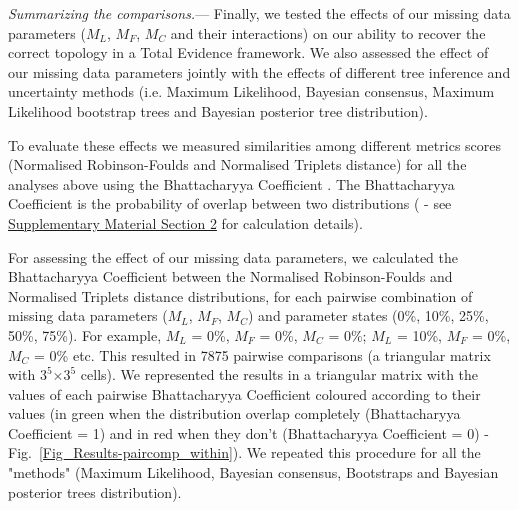 \documentclass[12pt,letterpaper]{article}
\renewcommand{\subsubsection}[1]{%
\vspace{2ex}
\noindent
\textit{#1.}---}
\begin{document}
\subsubsection{Summarizing the comparisons}
Finally, we tested the effects of our missing data parameters ($M_{L}$, $M_{F}$, $M_{C}$ and their interactions) on our ability to recover the correct topology in a Total Evidence framework. We also assessed the effect of our missing data parameters jointly with the effects of different tree inference and uncertainty methods (i.e. Maximum Likelihood, Bayesian consensus, Maximum Likelihood bootstrap trees and Bayesian posterior tree distribution).

To evaluate these effects we measured similarities among different metrics scores (Normalised Robinson-Foulds and Normalised Triplets distance) for all the analyses above using the Bhattacharyya Coefficient \citep{Bhattacharyya}. The Bhattacharyya Coefficient is the probability of overlap between two distributions (\citealt{Bhattacharyya} - see \hyperref[SupplementaryMaterial]{Supplementary Material Section 2} for calculation details).

For assessing the effect of our missing data parameters, we calculated the Bhattacharyya Coefficient between the Normalised Robinson-Foulds and Normalised Triplets distance distributions, for each pairwise combination of missing data parameters ($M_{L}$, $M_{F}$, $M_{C}$) and parameter states (0\%, 10\%, 25\%, 50\%, 75\%). For example, $M_{L}$ = 0\%, $M_{F}$ = 0\%, $M_{C}$ = 0\%; $M_{L}$ = 10\%, $M_{F}$ = 0\%, $M_{C}$ = 0\% etc. This resulted in 7875 pairwise comparisons (a triangular matrix with $3^5$$\times$$3^5$ cells). We represented the results in a triangular matrix with the values of each pairwise Bhattacharyya Coefficient coloured according to their values (in green when the distribution overlap completely (Bhattacharyya Coefficient = 1) and in red when they don't (Bhattacharyya Coefficient = 0) - Fig.~\ref{Fig_Results-paircomp_within}). We repeated this procedure for all the "methods" (Maximum Likelihood, Bayesian consensus, Bootstraps and Bayesian posterior trees distribution).
\end{document}
